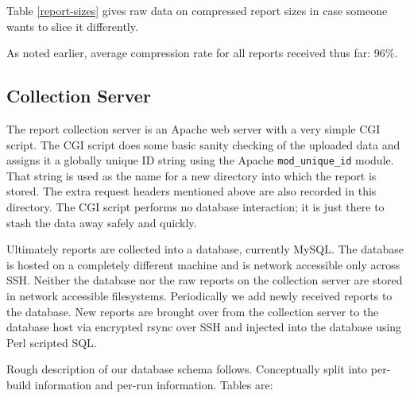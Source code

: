 \documentclass[times,10pt,twocolumn]{article}
\begin{document}
Table \ref{report-sizes} gives raw data on compressed report sizes in
case someone wants to slice it differently.

As noted earlier, average compression rate for all reports received
thus far: 96\%.
  
\subsection{Collection Server}

The report collection server is an Apache web server with a very
simple CGI script.  The CGI script does some basic sanity checking of
the uploaded data and assigns it a globally unique ID string using the
Apache \texttt{mod\_unique\_id} module.  That string is used as the
name for a new directory into which the report is stored.  The extra
request headers mentioned above are also recorded in this directory.
The CGI script performs no database interaction; it is just there to
stash the data away safely and quickly.

Ultimately reports are collected into a database, currently MySQL.
The database is hosted on a completely different machine and is
network accessible only across SSH.  Neither the database nor the raw
reports on the collection server are stored in network accessible
filesystems.  Periodically we add newly received reports to the
database.  New reports are brought over from the collection server to
the database host via encrypted rsync over SSH and injected into the
database using Perl scripted SQL.

Rough description of our database schema follows.  Conceptually split
into per-build information and per-run information.  Tables are:
\end{document}
